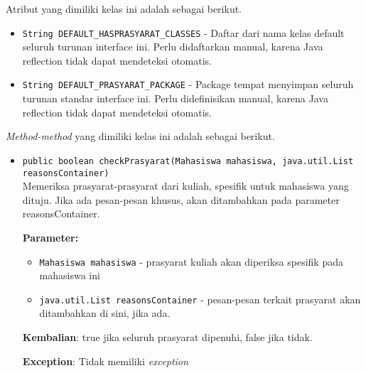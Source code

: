 \documentclass{article}
\begin{document}
\begin{enumerate}
Atribut yang dimiliki kelas ini adalah sebagai berikut.
\begin{itemize}
\item \texttt{String DEFAULT\_HASPRASYARAT\_CLASSES} - Daftar dari nama kelas default seluruh turunan interface ini. Perlu didaftarkan
 manual, karena Java reflection tidak dapat mendeteksi otomatis.
\item \texttt{String DEFAULT\_PRASYARAT\_PACKAGE} - Package tempat menyimpan seluruh turunan standar interface ini. Perlu didefinisikan
 manual, karena Java reflection tidak dapat mendeteksi otomatis.
\end{itemize}
\textit{Method-method} yang dimiliki kelas ini adalah sebagai berikut.
\begin{itemize}
\item \texttt{public boolean checkPrasyarat(Mahasiswa mahasiswa, java.util.List reasonsContainer)}\\ 
Memeriksa prasyarat-prasyarat dari kuliah, spesifik untuk mahasiswa
 yang dituju. Jika ada pesan-pesan khusus, akan ditambahkan pada parameter
 reasonsContainer.

\textbf{Parameter:}
\begin{itemize}
\item \texttt{Mahasiswa mahasiswa} - 
prasyarat kuliah akan diperiksa spesifik pada mahasiswa ini
\item \texttt{java.util.List reasonsContainer} - 
pesan-pesan terkait prasyarat akan ditambahkan di sini, jika ada.
\end{itemize}
\textbf{Kembalian}: true jika seluruh prasyarat dipenuhi, false jika tidak.

\textbf{Exception}: Tidak memiliki \textit{exception}


\end{itemize}
\end{enumerate}
\end{document}
